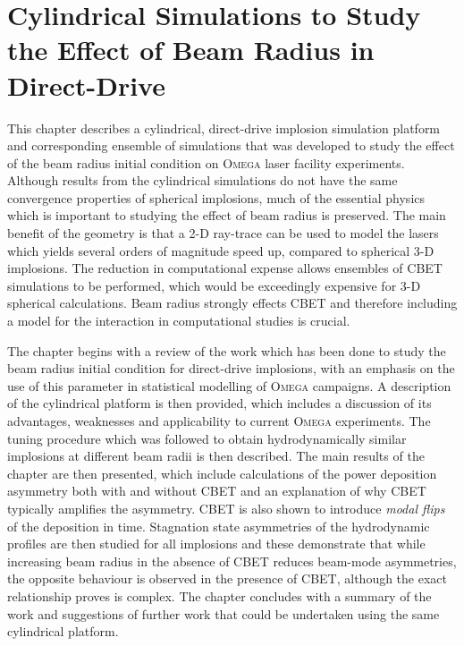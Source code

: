 \chapter{Cylindrical Simulations to Study the Effect of Beam Radius in Direct-Drive}

This chapter describes a cylindrical, direct-drive implosion simulation platform and corresponding ensemble of simulations that was developed to study the effect of the beam radius initial condition on \textsc{Omega} laser facility experiments.
Although results from the cylindrical simulations do not have the same convergence properties of spherical implosions, much of the essential physics which is important to studying the effect of beam radius is preserved.
The main benefit of the geometry is that a 2-D ray-trace can be used to model the lasers which yields several orders of magnitude speed up, compared to spherical 3-D implosions.
The reduction in computational expense allows ensembles of \ac{CBET} simulations to be performed, which would be exceedingly expensive for 3-D spherical calculations.
Beam radius strongly effects \ac{CBET} and therefore including a model for the interaction in computational studies is crucial.

The chapter begins with a review of the work which has been done to study the beam radius initial condition for direct-drive implosions, with an emphasis on the use of this parameter in statistical modelling of \textsc{Omega} campaigns.
A description of the cylindrical platform is then provided, which includes a discussion of its advantages, weaknesses and applicability to current \textsc{Omega} experiments.
The tuning procedure which was followed to obtain hydrodynamically similar implosions at different beam radii is then described.
The main results of the chapter are then presented, which include calculations of the power deposition asymmetry both with and without \ac{CBET} and an explanation of why \ac{CBET} typically amplifies the asymmetry.
\ac{CBET} is also shown to introduce \textit{modal flips} of the deposition in time.
Stagnation state asymmetries of the hydrodynamic profiles are then studied for all implosions and these demonstrate that while increasing beam radius in the absence of \ac{CBET} reduces beam-mode asymmetries, the opposite behaviour is observed in the presence of \ac{CBET}, although the exact relationship proves is complex.
The chapter concludes with a summary of the work and suggestions of further work that could be undertaken using the same cylindrical platform.

